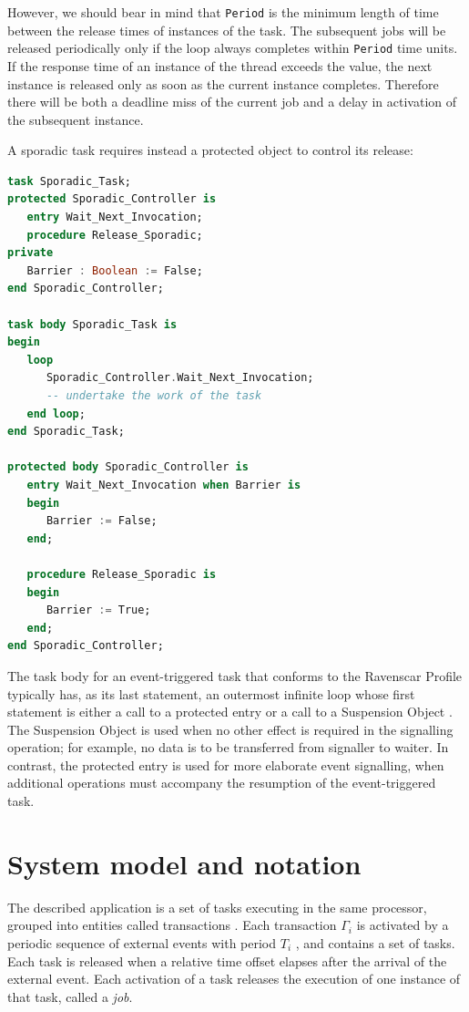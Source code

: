 \documentclass{article}
\begin{document}
However, we should bear in mind that \texttt{Period} is the minimum length of time between the release times of instances of the task. The subsequent jobs will be released periodically only if the loop always completes within \texttt{Period} time units. If the response time of an instance of the thread exceeds the value, the next instance is released only as soon as the current instance completes. Therefore there will be both a deadline miss of the current job and a delay in activation of the subsequent instance.

A sporadic task requires instead a protected object to control its release:

\begin{lstlisting}[language=Ada]
task Sporadic_Task;
protected Sporadic_Controller is
   entry Wait_Next_Invocation;
   procedure Release_Sporadic;
private
   Barrier : Boolean := False;
end Sporadic_Controller;

task body Sporadic_Task is
begin
   loop
      Sporadic_Controller.Wait_Next_Invocation;
      -- undertake the work of the task
   end loop;
end Sporadic_Task;

protected body Sporadic_Controller is
   entry Wait_Next_Invocation when Barrier is
   begin
      Barrier := False;
   end;

   procedure Release_Sporadic is
   begin
      Barrier := True;
   end;
end Sporadic_Controller;
\end{lstlisting}

The task body for an event-triggered task that conforms to the Ravenscar Profile typically has, as its last statement, an outermost infinite loop whose first statement is either a call to a protected entry or a call to a Suspension Object \cite{ycs}. The Suspension Object is used when no other effect is required in the signalling operation; for example, no data is to be transferred from signaller to waiter. In contrast, the protected entry is used for more elaborate event signalling, when additional operations must accompany the resumption of the event-triggered task.

\section{System model and notation}\label{model-notation}

The described application is a set of tasks executing in the same processor, grouped into entities called transactions \cite{tindell-offsets}. Each transaction $\Gamma_i$ is activated by a periodic sequence of external events with period $T_i$ , and contains a set of tasks. Each task is released when a relative time offset elapses after the arrival of the external event. Each activation of a task releases the execution of one instance of that task, called a \textit{job}.
\end{document}
